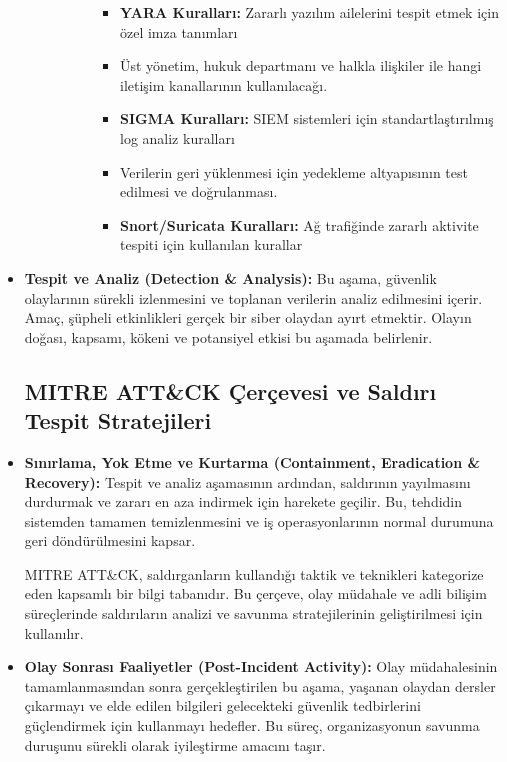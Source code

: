 \begin{itemize}
\begin{itemize}
\begin{itemize}
\begin{itemize}
\begin{itemize}
        \item \textbf{YARA Kuralları:} Zararlı yazılım ailelerini tespit etmek için özel imza tanımları            \item Üst yönetim, hukuk departmanı ve halkla ilişkiler ile hangi iletişim kanallarının kullanılacağı.

        \item \textbf{SIGMA Kuralları:} SIEM sistemleri için standartlaştırılmış log analiz kuralları            \item Verilerin geri yüklenmesi için yedekleme altyapısının test edilmesi ve doğrulanması.

        \item \textbf{Snort/Suricata Kuralları:} Ağ trafiğinde zararlı aktivite tespiti için kullanılan kurallar        \end{itemize}

    \end{itemize}    \end{itemize}

\end{itemize}    \item \textbf{Tespit ve Analiz (Detection \& Analysis):} Bu aşama, güvenlik olaylarının sürekli izlenmesini ve toplanan verilerin analiz edilmesini içerir. Amaç, şüpheli etkinlikleri gerçek bir siber olaydan ayırt etmektir. Olayın doğası, kapsamı, kökeni ve potansiyel etkisi bu aşamada belirlenir.



\subsection{MITRE ATT\&CK Çerçevesi ve Saldırı Tespit Stratejileri}    \item \textbf{Sınırlama, Yok Etme ve Kurtarma (Containment, Eradication \& Recovery):} Tespit ve analiz aşamasının ardından, saldırının yayılmasını durdurmak ve zararı en aza indirmek için harekete geçilir. Bu, tehdidin sistemden tamamen temizlenmesini ve iş operasyonlarının normal durumuna geri döndürülmesini kapsar.

MITRE ATT\&CK, saldırganların kullandığı taktik ve teknikleri kategorize eden kapsamlı bir bilgi tabanıdır. Bu çerçeve, olay müdahale ve adli bilişim süreçlerinde saldırıların analizi ve savunma stratejilerinin geliştirilmesi için kullanılır.

    \item \textbf{Olay Sonrası Faaliyetler (Post-Incident Activity):} Olay müdahalesinin tamamlanmasından sonra gerçekleştirilen bu aşama, yaşanan olaydan dersler çıkarmayı ve elde edilen bilgileri gelecekteki güvenlik tedbirlerini güçlendirmek için kullanmayı hedefler. Bu süreç, organizasyonun savunma duruşunu sürekli olarak iyileştirme amacını taşır.


\end{itemize}
